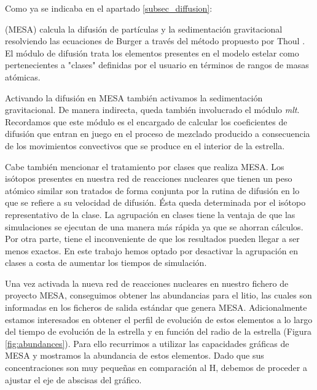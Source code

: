 Como ya se indicaba en el apartado \ref{subsec_diffusion}:
\begin{center}
    \begin{minipage}{0.9\linewidth}
        \vspace{5pt}%
        {\small
        (MESA) calcula la difusión de partículas y la sedimentación gravitacional resolviendo las ecuaciones de Burger a través del método propuesto por Thoul \citep{Thoul1993}. El módulo de difusión trata los elementos presentes en el modelo estelar como pertenecientes a "clases" definidas por el usuario en términos de rangos de masas atómicas.
        }
        \vspace{5pt}%
    \end{minipage}
\end{center}

Activando la difusión en MESA también activamos la sedimentación gravitacional. De manera indirecta, queda también involucrado el módulo \textit{mlt}. Recordamos que este módulo es el encargado de calcular los coeficientes de difusión que entran en juego en el proceso de mezclado producido a consecuencia de los movimientos convectivos que se produce en el interior de la estrella.\par

Cabe también mencionar el tratamiento por clases que realiza MESA. Los isótopos presentes en nuestra red de reacciones nucleares que tienen un peso atómico similar son tratados de forma conjunta por la rutina de difusión en lo que se refiere a su velocidad de difusión. Ésta queda determinada por el isótopo representativo de la clase. La agrupación en clases tiene la ventaja de que las simulaciones se ejecutan de una manera más rápida ya que se ahorran cálculos. Por otra parte, tiene el inconveniente de que los resultados pueden llegar a ser menos exactos. En este trabajo hemos optado por desactivar la agrupación en clases a costa de aumentar los tiempos de simulación.\par

Una vez activada la nueva red de reacciones nucleares en nuestro fichero de proyecto MESA, conseguimos obtener las abundancias para el litio, las cuales son informadas en los ficheros de salida estándar que genera MESA. Adicionalmente estamos interesados en obtener el perfil de evolución de estos elementos a lo largo del tiempo de evolución de la estrella y en función del radio de la estrella (Figura \ref{fig:abundances}). Para ello recurrimos a utilizar las capacidades gráficas de MESA y mostramos la abundancia de estos elementos. Dado que sus concentraciones son muy pequeñas en comparación al H, debemos de proceder a ajustar el eje de abscisas del gráfico.\par

